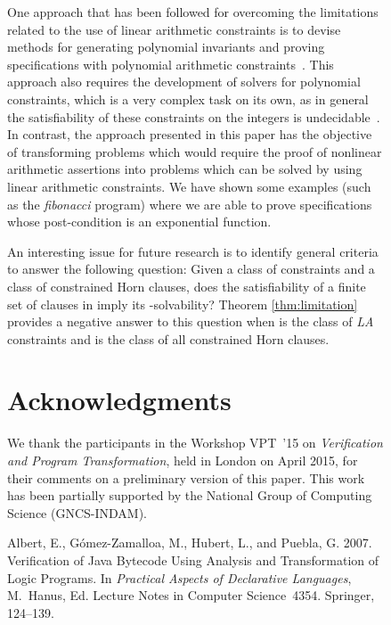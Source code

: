 \documentclass[english]{tlp}
\begin{document}
\begin{figure}[ht]
\begin{flushleft}
\begin{minipage}{124mm}
One approach that has been followed for overcoming the limitations
related to the use of linear arithmetic constraints is to
devise methods for generating polynomial invariants and proving
specifications with polynomial arithmetic constraints~\cite{RoK07a,RoK07b}. 
This approach also requires the development
of solvers for polynomial constraints, which is a very complex task on its own,
as in general the satisfiability of these constraints on the integers 
is undecidable~\cite{Mat70}.
In contrast, the approach presented in this paper  has the objective of transforming
problems which would require the proof of nonlinear 
arithmetic assertions into problems
which can be solved by using linear arithmetic constraints.
We have shown some examples (such as the  {\it fibonacci} program)
where we are able to prove specifications whose post-condition
is an exponential function.

An interesting issue for future research is 
to identify general criteria to answer the following question:
Given a class  of constraints and a class 
of constrained Horn clauses, does the satisfiability
of a finite set of clauses in  
imply its \mbox{-solvability?}
Theorem \ref{thm:limitation} provides a negative answer to this question when
 is the class of {\it LA} constraints and
 is the class of all constrained Horn clauses.



\section{Acknowledgments}

We thank the participants in the Workshop VPT~'15 on
{\it Verification and Program Transformation}, held in London on April 2015, 
for their comments on a preliminary version of this paper.
This work has been partially supported by the National Group of 
Computing Science (GNCS-INDAM).



\begin{thebibliography}{}

{\sc Albert, E.}, {\sc G\'{o}mez-Zamalloa, M.}, {\sc Hubert, L.}, {\sc and}
  {\sc Puebla, G.} 2007.
\newblock Verification of {J}ava {B}ytecode {U}sing {A}nalysis and
  {T}ransformation of {L}ogic {P}rograms.
\newblock In {\em Practical {A}spects of {D}eclarative {L}anguages},
  {M.~Hanus}, Ed. Lecture Notes in Computer Science~4354. Springer, 124--139.


\end{thebibliography}
\end{minipage}
\end{flushleft}
\end{figure}
\end{document}
